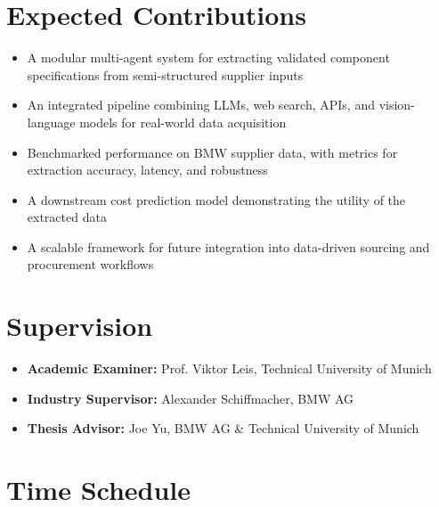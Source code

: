 \documentclass[11pt]{article}
\begin{document}
\section*{Expected Contributions}
\begin{itemize}
  \item A modular multi-agent system for extracting validated component specifications from semi-structured supplier inputs
  \item An integrated pipeline combining LLMs, web search, APIs, and vision-language models for real-world data acquisition
  \item Benchmarked performance on BMW supplier data, with metrics for extraction accuracy, latency, and robustness
  \item A downstream cost prediction model demonstrating the utility of the extracted data
  \item A scalable framework for future integration into data-driven sourcing and procurement workflows
\end{itemize}



\section*{Supervision}
\begin{itemize}
  \item \textbf{Academic Examiner:} Prof. Viktor Leis, Technical University of Munich
  \item \textbf{Industry Supervisor:} Alexander Schiffmacher, BMW AG
  \item \textbf{Thesis Advisor:} Joe Yu, BMW AG \& Technical University of Munich
\end{itemize}


\section*{Time Schedule}
\end{document}
